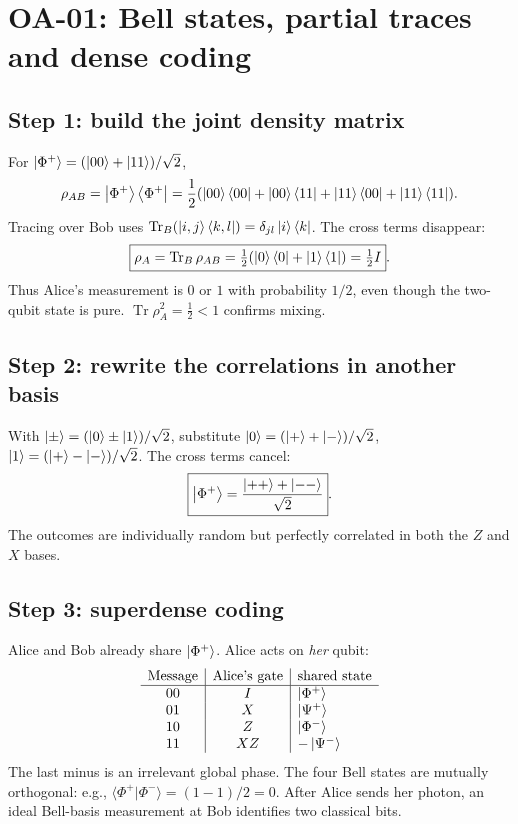 
\section{OA-01: Bell states, partial traces and dense coding}
\subsection*{Step 1: build the joint density matrix}
For \(\left\lvert \Phi^+\right\rangle=(\left\lvert 00\right\rangle+\left\lvert 11\right\rangle)/\sqrt2\),
\[
\rho_{AB}=\left\lvert \Phi^+\right\rangle\left\langle \Phi^+\right\rvert
=\frac12(\left\lvert 00\right\rangle\left\langle 00\right\rvert+\left\lvert 00\right\rangle\left\langle 11\right\rvert
+\left\lvert 11\right\rangle\left\langle 00\right\rvert+\left\lvert 11\right\rangle\left\langle 11\right\rvert).
\]
Tracing over Bob uses
\(\operatorname{Tr}_B(\left\lvert i,j\right\rangle\left\langle k,l\right\rvert)
=\delta_{jl}\left\lvert i\right\rangle\left\langle k\right\rvert\).
The cross terms disappear:
\[
\boxed{\rho_A=\operatorname{Tr}_B\rho_{AB}
=\tfrac12(\left\lvert 0\right\rangle\left\langle 0\right\rvert+\left\lvert 1\right\rangle\left\langle 1\right\rvert)=\tfrac12I}.
\]
Thus Alice's measurement is \(0\) or \(1\) with probability
\(1/2\), even though the two-qubit state is pure.
\(\operatorname{Tr}\rho_A^2=\tfrac12<1\) confirms mixing.

\subsection*{Step 2: rewrite the correlations in another basis}
With \(\left\lvert \pm\right\rangle=(\left\lvert 0\right\rangle\pm\left\lvert 1\right\rangle)/\sqrt2\),
substitute \(\left\lvert 0\right\rangle=(\left\lvert +\right\rangle+\left\lvert -\right\rangle)/\sqrt2\),
\(\left\lvert 1\right\rangle=(\left\lvert +\right\rangle-\left\lvert -\right\rangle)/\sqrt2\). The cross terms cancel:
\[
\boxed{\left\lvert \Phi^+\right\rangle
=\frac{\left\lvert ++\right\rangle+\left\lvert --\right\rangle}{\sqrt2}}.
\]
The outcomes are individually random but perfectly
correlated in both the \(Z\) and \(X\) bases.

\subsection*{Step 3: superdense coding}
Alice and Bob already share \(\left\lvert \Phi^+\right\rangle\).
Alice acts on \emph{her} qubit:
\[
\begin{array}{c|c|l}
\text{Message}&\text{Alice's gate}&\text{shared state}\\\hline
00&I&\left\lvert \Phi^+\right\rangle\\
01&X&\left\lvert \Psi^+\right\rangle\\
10&Z&\left\lvert \Phi^-\right\rangle\\
11&XZ&-\left\lvert \Psi^-\right\rangle
\end{array}
\]
The last minus is an irrelevant global phase. The
four Bell states are mutually orthogonal: e.g.,
\(\langle\Phi^+|\Phi^-\rangle=(1-1)/2=0\).
After Alice sends her photon, an ideal Bell-basis
measurement at Bob identifies two classical bits.

